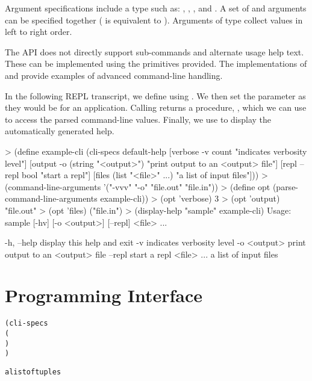 Argument specifications include a type such as: ,
, , and .  A set of 
and  arguments can be specified together ( is
equivalent to   ). Arguments of type
 collect values in left to right order.

The API does not directly support sub-commands and alternate usage
help text. These can be implemented using the primitives provided. The
implementations of  and  provide
examples of advanced command-line handling.

In the following REPL transcript, we define  using
. We then set the 
parameter as they would be for an application. Calling
 returns a procedure, ,
which we can use to access the parsed command-line values. Finally, we use
 to display the automatically generated help.

\codebegin
> (define example-cli
    (cli-specs
     default-help
     [verbose -v count "indicates verbosity level"]
     [output -o (string "<output>") "print output to an <output> file"]
     [repl --repl bool "start a repl"]
     [files (list "<file>" ...) "a list of input files"]))
> (command-line-arguments '("-vvv" "-o" "file.out" "file.in"))
> (define opt (parse-command-line-arguments example-cli))
> (opt 'verbose)
3
> (opt 'output)
"file.out"
> (opt 'files)
("file.in")
> (display-help "sample" example-cli)
Usage: sample [-hv] [-o <output>] [--repl] <file> ...

  -h, --help        display this help and exit
  -v                indicates verbosity level
  -o <output>       print output to an <output> file
  --repl            start a repl
  <file> ...        a list of input files
\codeend

\section {Programming Interface}

\begin{syntax}
  \begin{alltt}
(cli-specs
  (    
    )
  \etc{})\strut\end{alltt}
\end{syntax}
\expandsto{}\begin{alltt}\antipar
a list of  tuples
\end{alltt}

